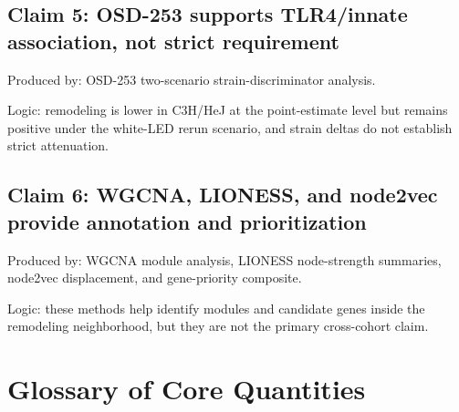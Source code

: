 \documentclass[11pt]{article}
\begin{document}
\subsection{Claim 5: OSD-253 supports TLR4/innate association, not strict requirement}

Produced by: OSD-253 two-scenario strain-discriminator analysis.

Logic: remodeling is lower in C3H/HeJ at the point-estimate level but remains positive under the white-LED rerun scenario, and strain deltas do not establish strict attenuation.

\subsection{Claim 6: WGCNA, LIONESS, and node2vec provide annotation and prioritization}

Produced by: WGCNA module analysis, LIONESS node-strength summaries, node2vec displacement, and gene-priority composite.

Logic: these methods help identify modules and candidate genes inside the remodeling neighborhood, but they are not the primary cross-cohort claim.

\appendix
\section{Glossary of Core Quantities}
\end{document}
